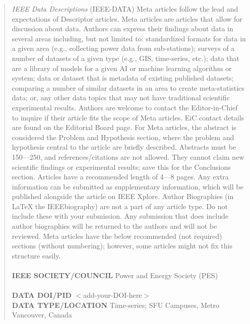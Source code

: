 \documentclass{IEEEoj-data}
\begin{document}
\begin{abstract}
\textit{IEEE Data Descriptions} (IEEE-DATA) Meta articles follow the lead and expectations of Descriptor articles. Meta articles are articles that allow for discussion about data. Authors can express their findings about data in several areas including, but not limited to: standardized formats for data in a given area (e.g., collecting power data from sub-stations); surveys of a number of datasets of a given type (e.g., GIS, time-series, etc.); data that are a library of models for a given AI or machine learning algorithm or system; data or dataset that is metadata of existing published datasets; comparing a number of similar datasets in an area to create meta-statistics data; or, any other data topics that may not have traditional scientific experimental results. Authors are welcome to contact the Editor-in-Chief to inquire if their article fits the scope of Meta articles. EiC contact details are found on the Editorial Board page. 
For Meta articles, the abstract is considered the Problem and Hypothesis section, where the problem and hypothesis central to the article are briefly described. Abstracts must be 150—250, and references/citations are not allowed. They cannot claim new scientific findings or experimental results; save this for the Conclusions section. Articles have a recommended length of 4—8 pages. Any extra information can be submitted as supplementary information, which will be published alongside the article on IEEE Xplore. Author Biographies (in LaTeX the IEEEbiography) are not a part of any article type. Do not include these with your submission. Any submission that does include author biographies will be returned to the authors and will not be reviewed. Meta articles have the below recommended (not required) sections (without numbering); however, some articles might not fix this structure easily.\\ 
 \\ 
 {\textcolor{ieeedata}{\abstractheadfont\bfseries{IEEE SOCIETY/COUNCIL}}}     Power and Energy Society (PES)\\  
 \\
 {\textcolor{ieeedata}{\abstractheadfont\bfseries{DATA DOI/PID}}}     $<$add-your-DOI-here$>$\\ 
  
 {\textcolor{ieeedata}{\abstractheadfont\bfseries{DATA TYPE/LOCATION}}}  Time-series; SFU Campuses, Metro Vancouver, Canada

\end{abstract}
\end{document}
